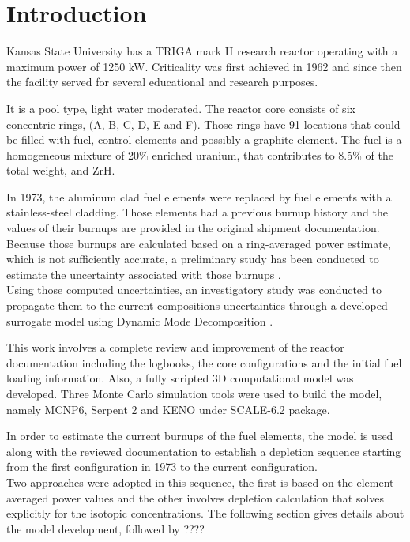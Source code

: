 \documentclass[review,number,sort&compress,12pt]{elsarticle}
\begin{document}
\linenumbers

\section{Introduction}
Kansas State University has a TRIGA mark II research reactor operating with a maximum power of 1250 kW. Criticality was first achieved in 1962 and since then the facility served for several educational and research purposes.

It is a pool type, light water moderated. The reactor core consists of six concentric rings, (A, B, C, D, E and F). Those rings have 91 locations that could be filled with fuel, control elements and possibly a graphite element.
The fuel is a homogeneous mixture of 20\% enriched uranium, that contributes to 8.5\% of the total weight, and ZrH.

In 1973, the aluminum clad fuel elements  were replaced by fuel elements with a stainless-steel cladding. Those elements had a previous burnup history and the values of their burnups are provided in the original shipment documentation. 
Because those burnups are calculated based on a ring-averaged power estimate, which is not sufficiently accurate, a preliminary study has been conducted to estimate the uncertainty associated with those burnups \cite{gairola2017estimating}.\\ Using those computed uncertainties, an investigatory study was conducted to propagate them to the current compositions uncertainties through a developed surrogate model using Dynamic Mode Decomposition \cite{recent paper}.

This work involves a complete review and improvement of the reactor documentation including the logbooks, the core configurations and the initial fuel loading information.
Also, a fully scripted 3D computational model was developed. Three Monte Carlo simulation tools were used to build the model, namely MCNP6, Serpent 2 and KENO under SCALE-6.2 package.

In order to estimate the current burnups of the fuel elements, the model is used along with the reviewed documentation to establish a depletion sequence starting from the first configuration in 1973 to the current configuration.\\
Two approaches were adopted in this sequence, the first is based on the element-averaged power values and the other involves depletion calculation that solves explicitly for the isotopic concentrations.
The following section gives details about the model development, followed by ????
\end{document}
